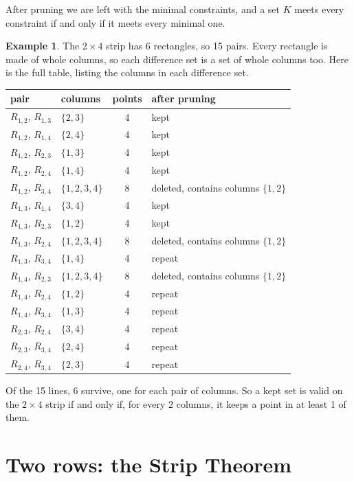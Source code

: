 \documentclass[11pt]{article}
\theoremstyle{definition}
\newtheorem{example}[theorem]{Example}
\theoremstyle{remark}
\begin{document}
After pruning we are left with the minimal constraints, and a set $K$ meets every constraint if
and only if it meets every minimal one.

\begin{example}\label{ex:prune}
The $2\times4$ strip has 6 rectangles, so 15 pairs. Every rectangle is made of whole columns, so
each difference set is a set of whole columns too. Here is the full table, listing the columns
in each difference set.
\begin{center}\small
\begin{tabular}{llcl}
\toprule
pair & columns & points & after pruning\\
\midrule
$R_{1,2}$, $R_{1,3}$ & $\{2,3\}$ & 4 & kept \\
$R_{1,2}$, $R_{1,4}$ & $\{2,4\}$ & 4 & kept \\
$R_{1,2}$, $R_{2,3}$ & $\{1,3\}$ & 4 & kept \\
$R_{1,2}$, $R_{2,4}$ & $\{1,4\}$ & 4 & kept \\
$R_{1,2}$, $R_{3,4}$ & $\{1,2,3,4\}$ & 8 & deleted, contains columns $\{1,2\}$ \\
$R_{1,3}$, $R_{1,4}$ & $\{3,4\}$ & 4 & kept \\
$R_{1,3}$, $R_{2,3}$ & $\{1,2\}$ & 4 & kept \\
$R_{1,3}$, $R_{2,4}$ & $\{1,2,3,4\}$ & 8 & deleted, contains columns $\{1,2\}$ \\
$R_{1,3}$, $R_{3,4}$ & $\{1,4\}$ & 4 & repeat \\
$R_{1,4}$, $R_{2,3}$ & $\{1,2,3,4\}$ & 8 & deleted, contains columns $\{1,2\}$ \\
$R_{1,4}$, $R_{2,4}$ & $\{1,2\}$ & 4 & repeat \\
$R_{1,4}$, $R_{3,4}$ & $\{1,3\}$ & 4 & repeat \\
$R_{2,3}$, $R_{2,4}$ & $\{3,4\}$ & 4 & repeat \\
$R_{2,3}$, $R_{3,4}$ & $\{2,4\}$ & 4 & repeat \\
$R_{2,4}$, $R_{3,4}$ & $\{2,3\}$ & 4 & repeat \\
\bottomrule
\end{tabular}
\end{center}
Of the 15 lines, 6 survive, one for each pair of columns. So a kept set is valid on the
$2\times4$ strip if and only if, for every 2 columns, it keeps a point in at least 1 of them.
\end{example}

\section{Two rows: the Strip Theorem}\label{sec:strip}
\end{document}
